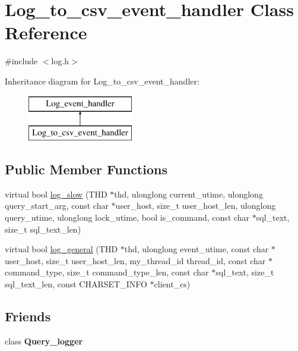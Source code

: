 \hypertarget{classLog__to__csv__event__handler}{}\section{Log\+\_\+to\+\_\+csv\+\_\+event\+\_\+handler Class Reference}
\label{classLog__to__csv__event__handler}


{\ttfamily \#include $<$log.\+h$>$}

Inheritance diagram for Log\+\_\+to\+\_\+csv\+\_\+event\+\_\+handler\+:\begin{figure}[H]
\begin{center}
\leavevmode
\includegraphics[height=2.000000cm]{classLog__to__csv__event__handler}
\end{center}
\end{figure}
\subsection*{Public Member Functions}
\begin{DoxyCompactItemize}
\item 
virtual bool \mbox{\hyperlink{classLog__to__csv__event__handler_a70587b1ff21463136fe16302d13b3740}{log\+\_\+slow}} (T\+HD $\ast$thd, ulonglong current\+\_\+utime, ulonglong query\+\_\+start\+\_\+arg, const char $\ast$user\+\_\+host, size\+\_\+t user\+\_\+host\+\_\+len, ulonglong query\+\_\+utime, ulonglong lock\+\_\+utime, bool is\+\_\+command, const char $\ast$sql\+\_\+text, size\+\_\+t sql\+\_\+text\+\_\+len)
\item 
virtual bool \mbox{\hyperlink{classLog__to__csv__event__handler_a9e6adb8b8ca2c5d12dfb4a788f615d67}{log\+\_\+general}} (T\+HD $\ast$thd, ulonglong event\+\_\+utime, const char $\ast$user\+\_\+host, size\+\_\+t user\+\_\+host\+\_\+len, my\+\_\+thread\+\_\+id thread\+\_\+id, const char $\ast$command\+\_\+type, size\+\_\+t command\+\_\+type\+\_\+len, const char $\ast$sql\+\_\+text, size\+\_\+t sql\+\_\+text\+\_\+len, const C\+H\+A\+R\+S\+E\+T\+\_\+\+I\+N\+FO $\ast$client\+\_\+cs)
\end{DoxyCompactItemize}
\subsection*{Friends}
\begin{DoxyCompactItemize}
\item 
\mbox{\label{classLog__to__csv__event__handler_a29c57bd3a5d5e62664217e3cd1fb457d}} 
class {\bfseries Query\+\_\+logger}
\end{DoxyCompactItemize}



